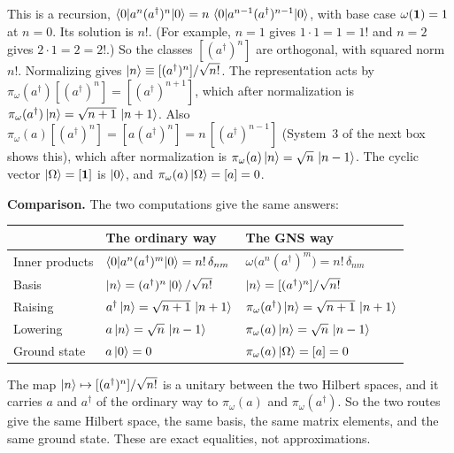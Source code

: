 \begin{physconnect}
This is a recursion, $\braket{0|a^n(a^\dagger)^n|0}=n\,\braket{0|a^{n-1}(a^\dagger)^{n-1}|0}$, with base case
$\omega(\mathbf{1})=1$ at $n=0$. Its solution is $n!$. (For example, $n=1$ gives $1\cdot1=1=1!$ and $n=2$ gives
$2\cdot1=2=2!$.) So the classes $[(a^\dagger)^n]$ are orthogonal, with squared norm $n!$. Normalizing gives
$\ket n\equiv[(a^\dagger)^n]/\sqrt{n!}$. The representation acts by $\pi_\omega(a^\dagger)[(a^\dagger)^n]=
[(a^\dagger)^{n+1}]$, which after normalization is $\pi_\omega(a^\dagger)\ket n=\sqrt{n+1}\,\ket{n+1}$. Also
$\pi_\omega(a)[(a^\dagger)^n]=[a(a^\dagger)^n]=n\,[(a^\dagger)^{n-1}]$ (System~3 of the next box shows this),
which after normalization is $\pi_\omega(a)\ket n=\sqrt n\,\ket{n-1}$. The cyclic vector $\ket\Omega=[\mathbf{1}]$ is
$\ket0$, and $\pi_\omega(a)\ket\Omega=[a]=0$.

\textbf{Comparison.} The two computations give the same answers:
\begin{center}
\small
\begin{tabular}{@{}lll@{}}
\toprule
& The ordinary way & The GNS way \\
\midrule
Inner products & $\braket{0|a^n(a^\dagger)^m|0}=n!\,\delta_{nm}$ & $\omega\big(a^n(a^\dagger)^m\big)=n!\,\delta_{nm}$ \\
Basis & $\ket n=(a^\dagger)^n\ket0/\sqrt{n!}$ & $\ket n=[(a^\dagger)^n]/\sqrt{n!}$ \\
Raising & $a^\dagger\ket n=\sqrt{n+1}\,\ket{n+1}$ & $\pi_\omega(a^\dagger)\ket n=\sqrt{n+1}\,\ket{n+1}$ \\
Lowering & $a\ket n=\sqrt n\,\ket{n-1}$ & $\pi_\omega(a)\ket n=\sqrt n\,\ket{n-1}$ \\
Ground state & $a\ket0=0$ & $\pi_\omega(a)\ket\Omega=[a]=0$ \\
\bottomrule
\end{tabular}
\end{center}
The map $\ket n\mapsto[(a^\dagger)^n]/\sqrt{n!}$ is a unitary between the two Hilbert spaces, and it carries
$a$ and $a^\dagger$ of the ordinary way to $\pi_\omega(a)$ and $\pi_\omega(a^\dagger)$. So the two routes give
the same Hilbert space, the same basis, the same matrix elements, and the same ground state. These are exact
equalities, not approximations.


\end{physconnect}
